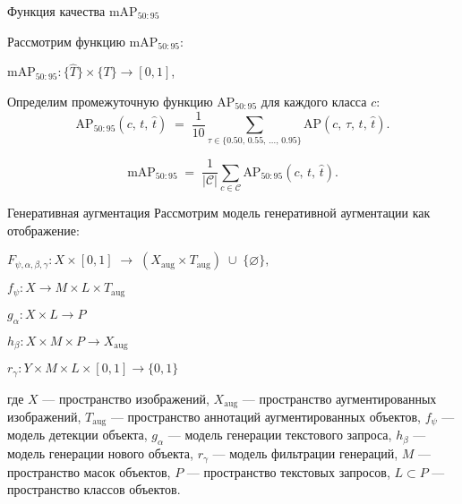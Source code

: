 \documentclass{beamer}
\begin{document}
\begin{frame}{Функция качества $\text{mAP}_{50:95}$}

Рассмотрим функцию $\text{mAP}_{50:95}$:
\begin{center}
   $\text{mAP}_{50:95}:  \{ \hat{T} \}  \times \{ T \} \to [0,1]$,
\end{center}

Определим промежуточную функцию $\text{AP}_{50:95}$ для каждого класса $c$:
\[
\text{AP}_{50:95}(c,\,t,\,\hat{t})
\;=\;
\frac{1}{10} 
\sum_{\tau \in \{0.50,\,0.55,\,\dots,\,0.95\}}
\text{AP}(c,\,\tau,\,t,\,\hat{t}).
\]

\[
\text{mAP}_{50:95}
\;=\;
\frac{1}{|\mathcal{C}|}
\sum_{c \in \mathcal{C}}
\text{AP}_{50:95}(c,\,t,\,\hat{t}).
\]

\end{frame}
\begin{frame}{Генеративная аугментация}
Рассмотрим модель генеративной аугментации как отображение:

\begin{center}

$
F_{\psi,\alpha,\beta,\gamma} : X \times [0,1] \;\longrightarrow\; (X_{\text{aug}} \times T_{\text{aug}}) \;\cup\; \{\varnothing\}, 
$

\end{center}
\begin{center}
$ f_{\psi}: X \to M \times L \times T_{\text{aug}}$
\end{center}
\begin{center}
$ g_{\alpha}: X \times L \to P$
\end{center}
\begin{center}
$ h_{\beta}: X \times M \times P \to X_{\text{aug}}$

\end{center}
\begin{center}
$ r_{\gamma}: Y \times M \times L \times [0,1] \to \{0,1\}$

\end{center}


где $X$ — пространство изображений,  
$X_{\text{aug}}$ — пространство аугментированных изображений, $T_{\text{aug}}$ — пространство аннотаций аугментированных объектов, $f_{\psi}$ — модель детекции объекта, $g_{\alpha}$ — модель генерации текстового запроса, $h_{\beta}$ — модель генерации нового объекта, $r_{\gamma}$ — модель фильтрации генераций,
$M$ — пространство масок объектов,  $P$ — пространство текстовых запросов, 
$L \subset P$ — пространство классов объектов.
\end{frame}
\end{document}
